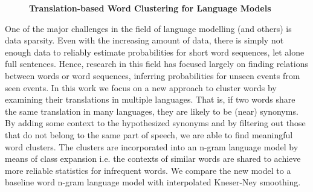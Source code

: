 \documentclass[10pt, a4paper, twopage, headinclude, footinclude, BCOR5mm]{book}
\begin{document}
\newpage

\begin{figure}[t!]
\centering
\large\textbf{Translation-based Word Clustering for Language Models}
\vspace*{0.5cm}
\end{figure}


\begin{table}[t!]
\end{table} 
\begin{table}[t!]
\end{table} 
\noindent
One of the major challenges in the field of language modelling (and others) is data sparsity. Even with the increasing amount of data, there is simply not enough data to reliably estimate probabilities for short word sequences, let alone full sentences. Hence, research in this field has focused largely on finding relations between words or word sequences, inferring probabilities for unseen events from seen events. In this work we focus on a new approach to cluster words by examining their translations in multiple languages. That is, if two words share the same translation in many languages, they are likely to be (near) synonyms.  By adding some context to the hypothesized synonyms and by filtering out those that do not belong to the same part of speech, we are able to find meaningful word clusters. The clusters are incorporated into an n-gram language model by means of class expansion i.e. the contexts of similar words are shared to achieve more reliable statistics for infrequent words. We compare the new model to a baseline word n-gram language model with interpolated Kneser-Ney smoothing.  
\end{document}
